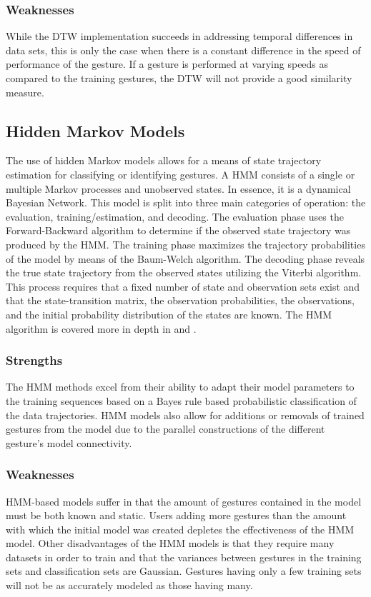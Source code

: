 \documentclass[conference]{IEEEtran}
\begin{document}
\subsubsection{Weaknesses}
While the DTW implementation succeeds in addressing temporal differences in data sets, this is only the case when there is a constant difference in the speed of performance of the gesture. If a gesture is performed at varying speeds as compared to the training gestures, the DTW will not provide a good similarity measure. 


\subsection{Hidden Markov Models}

The use of hidden Markov models allows for a means of state trajectory estimation for classifying or identifying gestures. A HMM consists of a single or multiple Markov processes and unobserved states. In essence, it is a dynamical Bayesian Network. This model is split into three main categories of operation: the evaluation, training/estimation, and decoding. The evaluation phase uses the Forward-Backward algorithm to determine if the observed state trajectory was produced by the HMM. The training phase maximizes the trajectory probabilities of the model by means of the Baum-Welch algorithm. The decoding phase reveals the true state trajectory from the observed states utilizing the Viterbi algorithm. This process requires that a fixed number of state and observation sets exist and that the state-transition matrix, the observation probabilities, the observations, and the initial probability distribution of the states are known. The HMM algorithm is covered more in depth in \cite{Kling} and \cite{FSM}.


\subsubsection{Strengths}
The HMM methods excel from their ability to adapt their model parameters to the training sequences based on a Bayes rule based probabilistic classification of the data trajectories. HMM models also allow for additions or removals of trained gestures from the model due to the parallel constructions of the different gesture's model connectivity. 

\subsubsection{Weaknesses}
HMM-based models suffer in that the amount of gestures contained in the model must be both known and static. Users adding more gestures than the amount with which the initial model was created depletes the effectiveness of the HMM model. Other disadvantages of the HMM models is that they require many datasets in order to train and that the variances between gestures in the training sets and classification sets are Gaussian. Gestures having only a few training sets will not be as accurately modeled as those having many.
\end{document}
